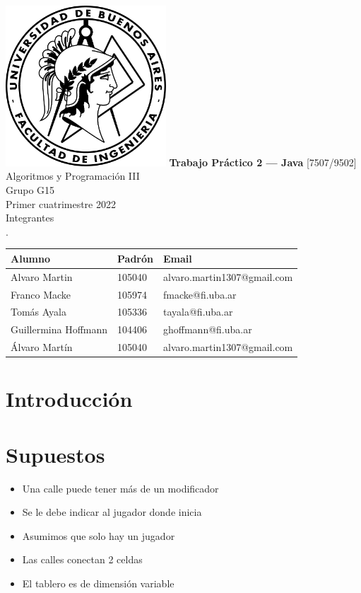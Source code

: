 \documentclass[titlepage,a4paper]{article}
\begin{document}
\begin{titlepage} %
	\hfill\includegraphics[width=6cm]{logofiuba.jpg}
    \centering
    \vfill
    \Huge \textbf{Trabajo Práctico 2 — Java}
    \vskip2cm
    \Large [7507/9502] Algoritmos y Programación III\\
    Grupo G15 \\
    Primer cuatrimestre 2022 \\
    \vfill
    Integrantes \\
    .\\
    \begin{tabular}{ | l | l | l | } %
      \hline
      Alumno & Padrón & Email \\ \hline
      Alvaro Martin & 105040 & alvaro.martin1307@gmail.com \\ \hline
      Franco Macke & 105974 & fmacke@fi.uba.ar \\ \hline
      Tomás Ayala & 105336 & tayala@fi.uba.ar \\ \hline
      Guillermina Hoffmann & 104406 & ghoffmann@fi.uba.ar \\ \hline
      Álvaro Martín & 105040 & alvaro.martin1307@gmail.com \\ \hline
  	\end{tabular}
    \vfill
    \vfill
\end{titlepage}

\tableofcontents %
\newpage

\section{Introducción}\label{sec:intro}

\section{Supuestos}\label{sec:supuestos}
  \begin{itemize}
    \item Una calle puede tener más de un modificador
    \item Se le debe indicar al jugador donde inicia
    \item Asumimos que solo hay un jugador
    \item Las calles conectan 2 celdas
    \item El tablero es de dimensión variable
  \end{itemize}
\end{document}

